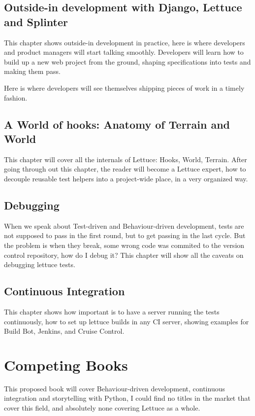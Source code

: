\documentclass[letterpaper]{article}
\begin{document}
\subsection*{Outside-in development with Django, Lettuce and Splinter}
\noindent
This chapter shows outside-in development in practice, here is where
developers and product managers will start talking smoothly.
Developers will learn how to build up a new web project from the
ground, shaping specifications into tests and making them pass.

\noindent
Here is where developers will see themselves shipping pieces of work in a timely fashion.

\subsection*{A World of hooks: Anatomy of Terrain and World}
\noindent
This chapter will cover all the internals of Lettuce: Hooks, World,
Terrain.  After going through out this chapter, the reader will become
a Lettuce expert, how to decouple reusable test helpers into a
project-wide place, in a very organized way.

\subsection*{Debugging}
\noindent
When we speak about Test-driven and Behaviour-driven development,
tests are not supposed to pass in the first round, but to get passing
in the last cycle.
\noindent
But the problem is when they break, some wrong code was commited to
the version control repository, how do I debug it?
\noindent
This chapter will show all the caveats on debugging lettuce tests.
\subsection*{Continuous Integration}
\noindent
This chapter shows how important is to have a server running the tests
continuously, how to set up lettuce builds in any CI server, showing
examples for Build Bot, Jenkins, and Cruise Control.

\section*{Competing Books }
\noindent
This proposed book will cover Behaviour-driven development, continuous
integration and storytelling with Python, I could find no titles in
the market that cover this field, and absolutely none covering
Lettuce as a whole.
\end{document}
